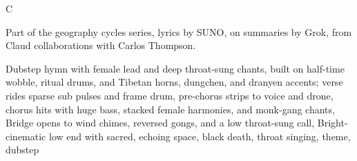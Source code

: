 
C
\begin{notes}
Part of the geography cycles series, lyrics by SUNO, on summaries by Grok, from Claud collaborations with Carlos Thompson.
\end{notes}
\begin{style}
Dubstep hymn with female lead and deep throat-sung chants, built on half-time wobble, ritual drums, and Tibetan horns, dungchen, and dranyen accents; verse rides sparse sub pulses and frame drum, pre-chorus strips to voice and drone, chorus hits with huge bass, stacked female harmonies, and monk-gang chants, Bridge opens to wind chimes, reversed gongs, and a low throat-sung call, Bright-cinematic low end with sacred, echoing space, black death, throat singing, theme, dubstep
\end{style}
